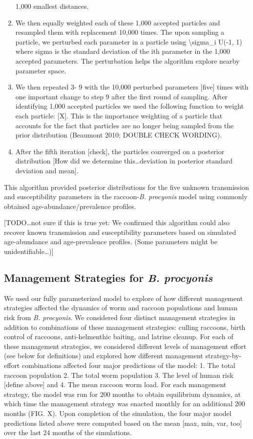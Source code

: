 \documentclass[11pt]{article}
\begin{document}
\begin{enumerate}
  1,000 smallest distances.
\item
  We then equally weighted each of these 1,000 accepted particles and
  resampled them with replacement 10,000 times. The upon sampling a
  particle, we perturbed each parameter in a particle using
  \textbackslash{}sigma\_i U(-1, 1) where sigma is the standard
  deviation of the ith parameter in the 1,000 accepted parameters. The
  perturbation helps the algorithm explore nearby parameter space.
\item
  We then repeated 3- 9 with the 10,000 perturbed parameters {[}five{]}
  times with one important change to step 9 after the first round of
  sampling. After identifying 1,000 accepted particles we used the
  following function to weight each particle: {[}X{]}. This is the
  importance weighting of a particle that accounts for the fact that
  particles are no longer being sampled from the prior distribution
  (Beaumont 2010; DOUBLE CHECK WORDING).
\item
  After the fifth iteration {[}check{]}, the particles converged on a
  posterior distribution {[}How did we determine this\ldots{}deviation
  in posterior standard deviation and mean{]}.
\end{enumerate}

This algorithm provided posterior distributions for the five unknown
transmission and susceptibility parameters in the raccoon-\emph{B.
procyonis} model using commonly obtained age-abundance/prevalence
profiles.

{[}TODO\ldots{}not sure if this is true yet: We confirmed this algorithm
could also recover known transmission and susceptibility parameters
based on simulated age-abundance and age-prevalence profiles. (Some
parameters might be unidentifiable\ldots{}){]}

\subsection{Management Strategies for \emph{B. procyonis}}

We used our fully parameterized model to explore of how different
management strategies affected the dynamics of worm and raccoon
populations and human risk from \emph{B. procyonis}. We considered four
distinct management strategies in addition to combinations of these
management strategies: culling raccoons, birth control of raccoons,
anti-helmenthic baiting, and latrine cleanup. For each of these
management strategies, we considered different levels of management
effort (see below for definitions) and explored how different management
strategy-by-effort combinations affected four major predictions of the
model: 1. The total raccoon population 2. The total worm population 3.
The level of human risk {[}define above{]} and 4. The mean raccoon worm
load. For each management strategy, the model was run for 200 months to
obtain equilibrium dynamics, at which time the management strategy was
enacted monthly for an additional 200 months (FIG. X). Upon completion
of the simulation, the four major model predictions listed above were
computed based on the mean {[}max, min, var, too{]} over the last 24
months of the simulations.
\end{document}
